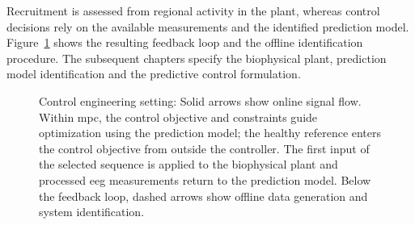 Recruitment is assessed from regional activity in the plant, whereas control decisions rely on the available measurements and the identified prediction model.
Figure~\ref{fig:control_setting} shows the resulting feedback loop and the offline identification procedure.
The subsequent chapters specify the biophysical plant, prediction model identification and the predictive control formulation.

\begin{figure}
    \centering
    
    \caption{Control engineering setting: Solid arrows show online signal flow. Within \acs{mpc}, the control objective and constraints guide optimization using the prediction model; the healthy reference enters the control objective from outside the controller. The first input of the selected sequence is applied to the biophysical plant and processed \acs{eeg} measurements return to the prediction model. Below the feedback loop, dashed arrows show offline data generation and system identification.}
    \label{fig:control_setting}
\end{figure}
